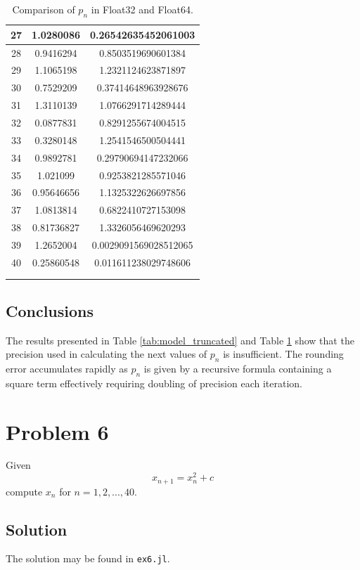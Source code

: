 \documentclass[a4paper, 12pt]{article}
\newcommand{\code}[1]{\texttt{#1}}
\begin{document}
\begin{longtable}[H]{ccc}
27  & 1.0280086   & 0.26542635452061003  \\ \midrule
28  & 0.9416294   & 0.8503519690601384   \\ \midrule
29  & 1.1065198   & 1.2321124623871897   \\ \midrule
30  & 0.7529209   & 0.37414648963928676  \\ \midrule
31  & 1.3110139   & 1.0766291714289444   \\ \midrule
32  & 0.0877831   & 0.8291255674004515   \\ \midrule
33  & 0.3280148   & 1.2541546500504441   \\ \midrule
34  & 0.9892781   & 0.29790694147232066  \\ \midrule
35  & 1.021099    & 0.9253821285571046   \\ \midrule
36  & 0.95646656  & 1.1325322626697856   \\ \midrule
37  & 1.0813814   & 0.6822410727153098   \\ \midrule
38  & 0.81736827  & 1.3326056469620293   \\ \midrule
39  & 1.2652004   & 0.0029091569028512065\\ \midrule
40  & 0.25860548  & 0.011611238029748606 \\ \bottomrule
\caption{Comparison of $p_n$ in Float32 and Float64.} \\
\label{tab:model_compare} \\
\end{longtable}

\subsection{Conclusions}
The results presented in Table \ref{tab:model_truncated} and Table
\ref{tab:model_compare} show that the precision used in calculating the next
values of $p_n$ is insufficient. The rounding error accumulates rapidly as $p_n$
is given by a recursive formula containing a square term effectively requiring
doubling of precision each iteration.

\section{Problem 6}
Given
\begin{equation}
x_{n+1} = x^2_n + c
\end{equation}
compute $x_n$ for $n = 1, 2, ..., 40$.

\subsection{Solution}
The solution may be found in \code{ex6.jl}.
\end{document}
